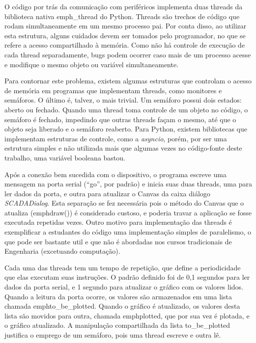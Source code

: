 O código por trás da comunicação com periféricos implementa duas threads da biblioteca nativa emph{\_thread} do Python. Threads são trechos de código que rodam simultaneamente em um mesmo processo pai. Por conta disso, ao utilizar esta estrutura, alguns cuidados devem ser tomados pelo programador, no que se refere a acesso compartilhado à memória. Como não há controle de execução de cada thread separadamente, bugs podem ocorrer caso mais de um processo acesse e modifique o mesmo objeto ou variável simultaneamente.

Para contornar este problema, existem algumas estruturas que controlam o acesso de memória em programas que implementam threads, como monitores e semáforos. O último é, talvez, o mais trivial. Um semáforo possui dois estados: aberto ou fechado. Quando uma thread toma controle de um objeto no código, o semáforo é fechado, impedindo que outras threads façam o mesmo, até que o objeto seja liberado e o semáforo reaberto. Para Python, existem bibliotecas que implementam estruturas de controle, como a \emph{asyncio}, porém, por ser uma estrutura simples e não utilizada mais que algumas vezes no código-fonte deste trabalho, uma variável booleana bastou.

Após a conexão bem sucedida com o dispositivo, o programa escreve uma mensagem na porta serial (“go”, por padrão) e inicia suas duas threads, uma para ler dados da porta, e outra para atualizar o Canvas da caixa diálogo \emph{SCADADialog}. Esta separação se fez necessária pois o método do Canvas que o atualiza (emph{draw()}) é considerado custoso, e poderia travar a aplicação se fosse executada repetidas vezes. Outro motivo para implementação das threads é exemplificar a estudantes do código uma implementação simples de paralelismo, o que pode ser bastante util e que não é abordadas nos cursos tradicionais de Engenharia (excetuando computação).

Cada uma das threads tem um tempo de repetição, que define a periodicidade que elas executam suas instruções. O padrão definido foi de 0,1 segundos para ler dados da porta serial, e 1 segundo para atualizar o gráfico com os valores lidos. Quando a leitura da porta ocorre, os valores são armazenados em uma lista chamada emph{to\_be\_plotted}. Quando o gráfico é atualizado, os valores desta lista são movidos para outra, chamada emph{plotted}, que por sua vez é plotada, e o gráfico atualizado. A manipulação compartilhada da lista to\_be\_plotted justifica o emprego de um semáforo, pois uma thread escreve e outra lê.

